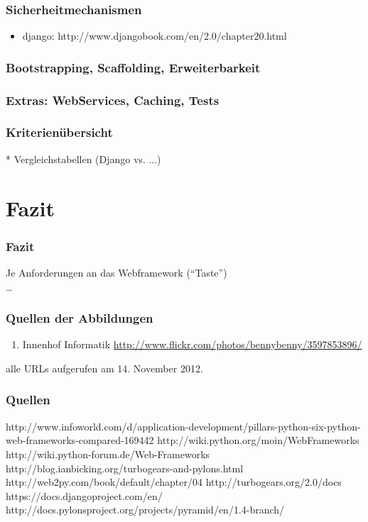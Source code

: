 \documentclass[
    t,
    smaller,
    compress,
]{beamer}
\begin{document}
\begin{frame}
  \frametitle{Sicherheitmechanismen}
  
  \begin{itemize}[<1->]
    \item django: http://www.djangobook.com/en/2.0/chapter20.html
    \end{itemize}

\end{frame}


\begin{frame}
  \frametitle{Bootstrapping, Scaffolding, Erweiterbarkeit}
\end{frame}


\begin{frame}
  \frametitle{Extras: WebServices, Caching, Tests}
\end{frame}


\begin{frame}
  \frametitle{Kriterienübersicht}
 * Vergleichstabellen (Django vs. ...)
\end{frame}


\section{Fazit}
\begin{frame}
  \frametitle{Fazit}

  Je Anforderungen an das Webframework (“Taste”)\\
  \dots
\end{frame}


\begin{frame}
  \frametitle{Quellen der Abbildungen}
  \footnotesize
  \begin{enumerate}[<1->]
    \item Innenhof Informatik
        \url{http://www.flickr.com/photos/bennybenny/3597853896/} \label{illu:1}
  \end{enumerate}
  alle URLs aufgerufen am 14. November 2012.
\end{frame}


\begin{frame}
  \frametitle{Quellen}
http://www.infoworld.com/d/application-development/pillars-python-six-python-web-frameworks-compared-169442
http://wiki.python.org/moin/WebFrameworks
http://wiki.python-forum.de/Web-Frameworks
http://blog.ianbicking.org/turbogears-and-pylons.html
http://web2py.com/book/default/chapter/04
http://turbogears.org/2.0/docs
https://docs.djangoproject.com/en/
http://docs.pylonsproject.org/projects/pyramid/en/1.4-branch/
\end{frame}
\end{document}
